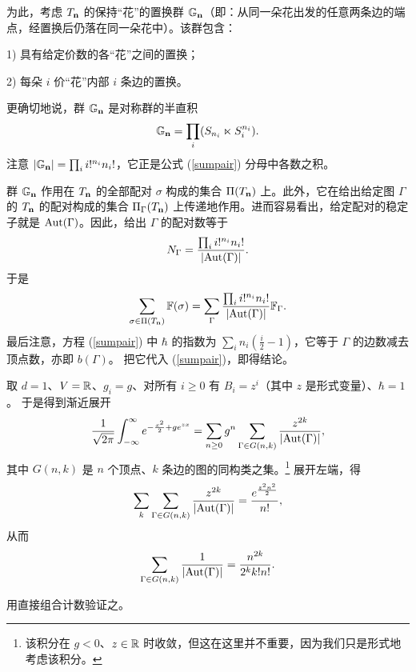 为此，考虑 $T_{\bold n}$ 的保持“花”的置换群 $\Bbb G_{\bold n}$（即：从同一朵花出发的任意两条边的端点，经置换后仍落在同一朵花中）。该群包含：

1) 具有给定价数的各“花”之间的置换；

2) 每朵 $i$ 价“花”内部 $i$ 条边的置换。

更确切地说，群 $\Bbb G_{\bold n}$ 是对称群的半直积
$$
\Bbb G_{\bold n}=\prod_i (S_{n_i}\ltimes S_i^{n_i}).
$$
注意 $|\Bbb G_{\bold n}|=\prod_i i!^{n_i}n_i!$，它正是公式 (\ref{sumpair}) 分母中各数之积。

群 $\Bbb G_{\bold n}$ 作用在 $T_{\bold n}$ 的全部配对 $\sigma$ 构成的集合 $\Pi(T_{\bold n})$ 上。此外，它在给出给定图 $\Gamma$ 的 $T_{\bold n}$ 的配对构成的集合 $\Pi_\Gamma(T_{\bold n})$ 上传递地作用。进而容易看出，给定配对的稳定子就是 ${\rm Aut}(\Gamma)$。因此，给出 $\Gamma$ 的配对数等于
$$
N_\Gamma=\frac{\prod_i i!^{n_i}n_i!}{|{\rm Aut}(\Gamma)|}.
$$
于是
$$
\sum_{\sigma\in \Pi(T_{\bold n})} \Bbb F(\sigma)=\sum_\Gamma \frac{\prod_i i!^{n_i}n_i!}{|{\rm Aut}(\Gamma)|}
\Bbb F_\Gamma.
$$
最后注意，方程 (\ref{sumpair}) 中 $\hbar$ 的指数为 $\sum_in_i(\frac{i}{2}-1)$，它等于 $\Gamma$ 的边数减去顶点数，亦即 $b(\Gamma)$。
把它代入 (\ref{sumpair})，即得结论。

\begin{example}\label{treeexa} 取 $d=1$、$V=\Bbb R$、$g_i=g$、对所有 $i\ge 0$ 有 $B_i=z^i$（其中 $z$ 是形式变量）、$\hbar=1$。
于是得到渐近展开
$$
\frac{1}{\sqrt{2\pi}}\int_{-\infty}^\infty e^{-\frac{x^2}{2}+ge^{zx}}=
\sum_{n\ge 0}g^n\sum_{\Gamma\in G(n,k)}\frac{z^{2k}}{|{\rm Aut}(\Gamma)|},
$$
其中 $G(n,k)$ 是 $n$ 个顶点、$k$ 条边的图的同构类之集。\footnote{该积分在 $g<0$、$z\in \Bbb R$ 时收敛，但这在这里并不重要，因为我们只是形式地考虑该积分。}
展开左端，得
$$
\sum_k\sum_{\Gamma\in G(n,k)}\frac{z^{2k}}{|{\rm Aut}(\Gamma)|}=\frac{e^{\frac{z^2n^2}{2}}}{n!},
$$
从而
$$
\sum_{\Gamma\in G(n,k)}\frac{1}{|{\rm Aut}(\Gamma)|}=\frac{n^{2k}}{2^kk!n!}.
$$
\end{example}

\begin{exercise} 用直接组合计数验证之。
\end{exercise}


